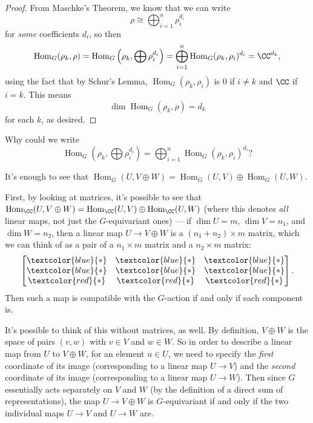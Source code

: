 \begin{proof}
From Maschke's Theorem, we know that we can write \[\rho \cong \bigoplus_{i = 1}^n \rho_i^{d_i}\] for \emph{some} coefficients $d_i$, so then \[\operatorname{Hom}_G(\rho_k, \rho) = \operatorname{Hom}_G\left(\rho_k, \bigoplus \rho_i^{d_i}\right) = \bigoplus_{i = 1}^n \operatorname{Hom}_G(\rho_k, \rho_i)^{d_i} = \CC^{d_k},\] using the fact that by Schur's Lemma, $\operatorname{Hom}_G(\rho_k, \rho_i) $ is $0$ if $i \neq k$ and $\CC$ if $i = k$. This means \[\dim \operatorname{Hom}_G(\rho_k, \rho) = d_k\] for each $k$, as desired. 
\end{proof}

\begin{question}
Why could we write \[\operatorname{Hom}_G\left(\rho_k, \bigoplus \rho_i^{ d_i}\right) = \bigoplus_{i = 1}^n \operatorname{Hom}_G(\rho_k, \rho_i)^{ d_i}?\]
\end{question}

\begin{ans}
It's enough to see that $\operatorname{Hom}_G(U, V \oplus W) = \operatorname{Hom}_G(U, V) \oplus \operatorname{Hom}_G(U, W)$. 

First, by looking at matrices, it's possible to see that $\operatorname{Hom}_{\CC}(U, V \oplus W) = \operatorname{Hom}_{\CC}(U, V) \oplus \operatorname{Hom}_{\CC}(U, W)$ (where this denotes \emph{all} linear maps, not just the $G$-equivariant ones) --- if $\dim U = m$, $\dim V = n_1$, and $\dim W = n_2$, then a linear map $U \to V \oplus W$ is a $(n_1 + n_2) \times m$ matrix, which we can think of as a pair of a $n_1 \times m$ matrix and a $n_2 \times m$ matrix: \[\begin{bmatrix} \textcolor{blue}{*} &  \textcolor{blue}{*} & \textcolor{blue}{*} \\ \textcolor{blue}{*} & \textcolor{blue}{*} & \textcolor{blue}{*} \\ \textcolor{red}{*} & \textcolor{red}{*} & \textcolor{red}{*}\end{bmatrix}.\] Then such a map is compatible with the $G$-action if and only if each component is.

It's possible to think of this without matrices, as well. By definition, $V \oplus W$ is the space of pairs $(v, w)$ with $v \in V$ and $w \in W$. So in order to describe a linear map from $U$ to $V \oplus W$, for an element $u \in U$, we need to specify the \emph{first} coordinate of its image (corresponding to a linear map $U \to V$) and the \emph{second} coordinate of its image (corresponding to a linear map $U \to W$). Then since $G$ essentially acts separately on $V$ and $W$ (by the definition of a direct sum of representations), the map $U \to V \oplus W$ is $G$-equivariant if and only if the two individual maps $U \to V$ and $U \to W$ are. 
\end{ans}

